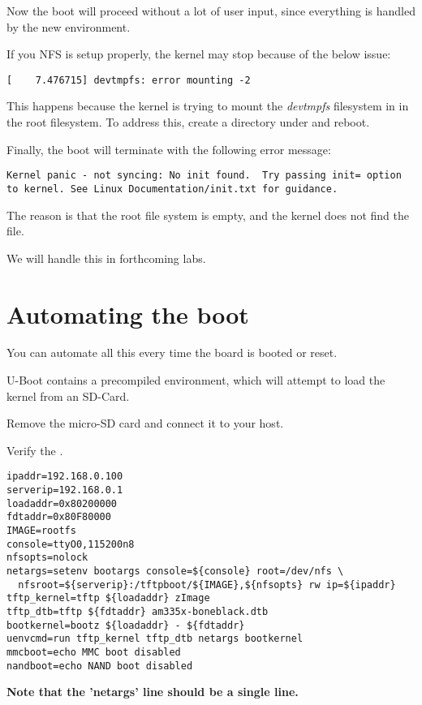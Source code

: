Now the boot will proceed without a lot of user input, since everything is
handled by the new environment.

If you NFS is setup properly, the kernel may stop because of the below issue:

\begin{verbatim}
[    7.476715] devtmpfs: error mounting -2
\end{verbatim}

This happens because the kernel is trying to mount the {\em devtmpfs}
filesystem in  in the root filesystem. To address this,
create a  directory under  and reboot.

Finally, the boot will terminate with the following error message:

\begin{verbatim}
Kernel panic - not syncing: No init found.  Try passing init= option to kernel. See Linux Documentation/init.txt for guidance. 
\end{verbatim}

The reason is that the root file system is empty, and the kernel does not find the  file.

We will handle this in forthcoming labs.
\clearpage
\section{Automating the boot}

You can automate all this every time the board is booted or reset. 

U-Boot contains a precompiled environment, which will attempt to load
the kernel from an SD-Card.

Remove the micro-SD card and connect it to your host.

Verify the .


\begin{verbatim}
ipaddr=192.168.0.100
serverip=192.168.0.1
loadaddr=0x80200000
fdtaddr=0x80F80000
IMAGE=rootfs
console=ttyO0,115200n8
nfsopts=nolock
netargs=setenv bootargs console=${console} root=/dev/nfs \
  nfsroot=${serverip}:/tftpboot/${IMAGE},${nfsopts} rw ip=${ipaddr}
tftp_kernel=tftp ${loadaddr} zImage
tftp_dtb=tftp ${fdtaddr} am335x-boneblack.dtb
bootkernel=bootz ${loadaddr} - ${fdtaddr}
uenvcmd=run tftp_kernel tftp_dtb netargs bootkernel
mmcboot=echo MMC boot disabled
nandboot=echo NAND boot disabled
\end{verbatim}

{\bf Note that the ’netargs’ line should be a single line.}

